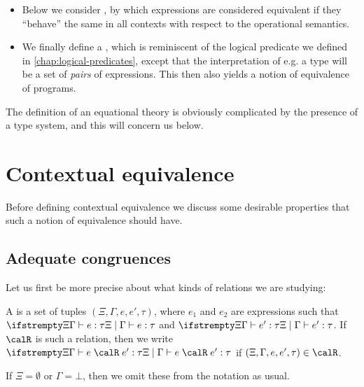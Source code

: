 \begin{itemize}
    \item Below we consider , by which expressions are considered equivalent if they \enquote{behave} the same in all contexts with respect to the operational semantics.

    \item We finally define a , which is reminiscent of the logical predicate we defined in \cref{chap:logical-predicates}, except that the interpretation of e.g. a type will be a set of \emph{pairs} of expressions. This then also yields a notion of equivalence of programs.
\end{itemize}
%
The definition of an equational theory is obviously complicated by the presence of a type system, and this will concern us below.


\section{Contextual equivalence}

Before defining contextual equivalence we discuss some desirable properties that such a notion of equivalence should have.

\subsection{Adequate congruences}

Let us first be more precise about what kinds of relations we are studying:


\newcommand{\typeindrel}[6]{\typerel{#1}{#2}{#3\mathrel{#4}#5}{#6}}
\newcommand{\kleene}{\simeq}
\newcommand{\setExpWT}[3]{\setExp_{#1,#2,#3}} %

\begin{definition}
    A  is a set of tuples $(\Xi,\Gamma,e,e',\tau)$, where $e_1$ and $e_2$ are expressions such that $\typerel{\Xi}{\Gamma}{e}{\tau}$ and $\typerel{\Xi}{\Gamma}{e'}{\tau}$. If $\calR$ is such a relation, then we write $\typeindrel{\Xi}{\Gamma}{e}{\calR}{e'}{\tau}$ if $(\Xi,\Gamma,e,e',\tau) \in \calR$.
\end{definition}
%
If $\Xi = \emptyset$ or $\Gamma = \bot$, then we omit these from the notation as usual.

